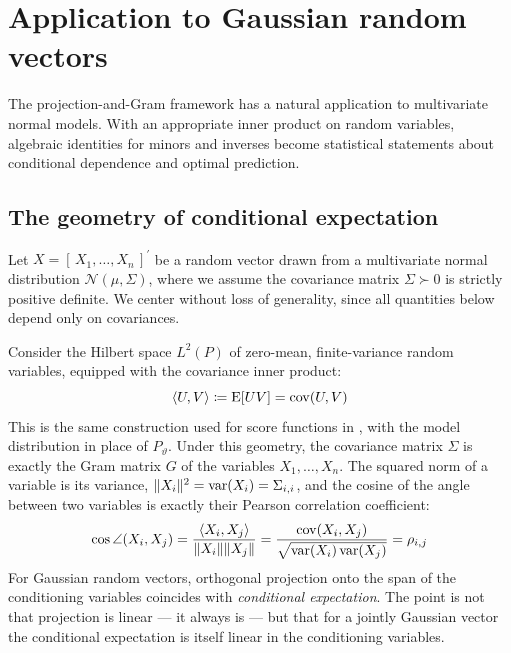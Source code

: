 \documentclass{IEEEtran}
\begin{document}
\section{Application to Gaussian random vectors}
\label{sec:gaussian-vectors}

The projection-and-Gram framework has a natural application to multivariate normal models. With an appropriate inner product on random variables, algebraic identities for minors and inverses become statistical statements about conditional dependence and optimal prediction.

\subsection{The geometry of conditional expectation}

Let $X = [\,X_{1}, \ldots, X_{n}\,]^{\prime}$ be a random vector drawn from a multivariate normal distribution $\mathcal{N}(\mu, \Sigma)$, where we assume the covariance matrix $\Sigma \succ 0$ is strictly positive definite. We center without loss of generality, since all quantities below depend only on covariances.

Consider the Hilbert space $L^{2}(P)$ of zero-mean, finite-variance random variables, equipped with the covariance inner product:
\begin{equation}
  \langle U, V\rangle \coloneq \operatorname{E}[U V] = \operatorname{cov}(U, V)
  \label{eq:cov-inner-product}
\end{equation}
This is the same construction used for score functions in , with the model distribution in place of $P_{\vartheta}$. Under this geometry, the covariance matrix $\Sigma$ is exactly the Gram matrix $G$ of the variables $X_{1}, \ldots, X_{n}$. The squared norm of a variable is its variance, $\lVert X_{i}\rVert^{2} = \operatorname{var}(X_{i}) = \Sigma_{i,i}$, and the cosine of the angle between two variables is exactly their Pearson correlation coefficient:
\begin{equation*}
  \cos \angle(X_{i}, X_{j})
  = \frac{\langle X_{i}, X_{j}\rangle}{\lVert X_{i}\rVert \lVert X_{j}\rVert}
  = \frac{\operatorname{cov}(X_{i}, X_{j})}{\sqrt{\operatorname{var}(X_{i})\operatorname{var}(X_{j})}}
  = \rho_{i,j}
\end{equation*}
For Gaussian random vectors, orthogonal projection onto the span of the conditioning variables coincides with \emph{conditional expectation}. The point is not that projection is linear --- it always is --- but that for a jointly Gaussian vector the conditional expectation is itself linear in the conditioning variables.
\end{document}
